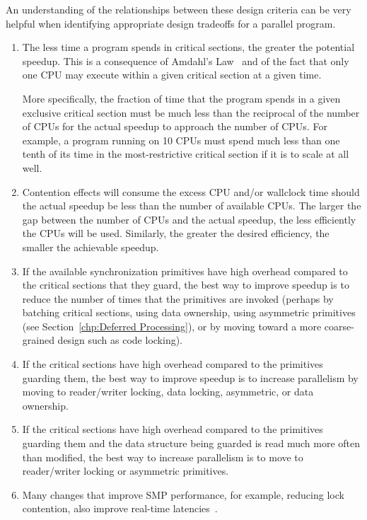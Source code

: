 An understanding of the relationships between these design criteria can
be very helpful when identifying appropriate design tradeoffs for a
parallel program.
\begin{enumerate}
\item	The less time a program spends in critical sections,
	the greater the potential speedup.
	This is a consequence of Amdahl's Law~\cite{GeneAmdahl1967AmdahlsLaw}
	and of the fact that only one CPU may execute within a given
	critical section at a given time.

	More specifically, the fraction of time that the program spends in
	a given exclusive critical section must be much less than
	the reciprocal of the number of CPUs for the
	actual speedup to approach the number of CPUs.
	For example, a program running on 10 CPUs must spend
	much less than one tenth of its time in the most-restrictive
	critical section if it is to scale at all well.
\item	Contention effects will consume the excess CPU and/or
	wallclock time should the actual speedup be less than
	the number of available CPUs.  The
	larger the gap between the number of CPUs
	and the actual speedup, the less efficiently the
	CPUs will be used.
	Similarly, the greater the desired efficiency, the smaller
	the achievable speedup.
\item	If the available synchronization primitives have
	high overhead compared to the critical sections
	that they guard, the best way to improve speedup
	is to reduce the number of times that the primitives
	are invoked (perhaps by batching critical sections,
	using data ownership, using asymmetric primitives
	(see Section~\ref{chp:Deferred Processing}),
	or by moving toward a more coarse-grained design
	such as code locking).
\item	If the critical sections have high overhead compared
	to the primitives guarding them, the best way
	to improve speedup is to increase parallelism
	by moving to reader/writer locking, data locking, asymmetric,
	or data ownership.
\item	If the critical sections have high overhead compared
	to the primitives guarding them and the data structure
	being guarded is read much more often than modified,
	the best way to increase parallelism is to move
	to reader/writer locking or asymmetric primitives.
\item	Many changes that improve SMP performance, for example,
	reducing lock contention, also improve real-time
	latencies~\cite{PaulMcKenney2005h}.
\end{enumerate}

\QuickQuizEnd
